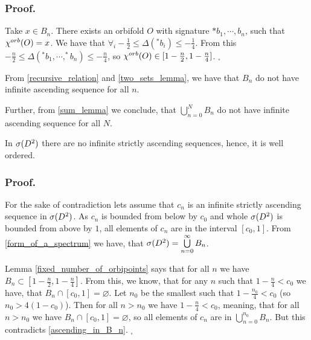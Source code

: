 \subsubsection{Proof.}
Take $x \in B_n$. There exists an orbifold $O$ with signature $\ast b_1, \cdots, b_n$, 
such that ${\chi^{orb}(O)} = x$. We have that $\forall_i -\frac{1}{2} \leq \Delta(^*b_i) \leq 
-\frac{1}{4}$. From this $-\frac{n}{2} \leq \Delta(^*b_1, \cdots, ^*b_n) \leq -\frac{n}{4}$, 
so ${\chi^{orb}(O)} \in [1-\frac{n}{2}, 1-\frac{n}{4}]$. $_\square$

\begin{observation}\label{ascending_in_B_n}
From \ref{recursive_relation} and \ref{two_sets_lemma}, we have that $B_n$ do not have 
infinite ascending sequence for all $n$. 

Further, from \ref{sum_lemma} we conclude, 
that $\bigcup\limits_{n=0}^N B_n$ do not have infinite ascending sequence for all $N$.
\end{observation}

\begin{theorem}\label{well_order}
In ${{\sigma}(D^2)}$ there are no infinite strictly ascending sequences, hence, it is well ordered.
\end{theorem}
\subsubsection{Proof.}
For the sake of contradiction lets assume that $c_n$ is an infinite strictly ascending sequence in 
${{\sigma}(D^2)}$. As $c_n$ is bounded from below by $c_0$ and whole ${{\sigma}(D^2)}$ is bounded from above 
by $1$, all elements of $c_n$ are in the interval $[c_0, 1]$. 
From \ref{form_of_a_spectrum} we have, that ${{\sigma}(D^2)} = \bigcup\limits^\infty_{n=0}B_n$. 

Lemma 
\ref{fixed_number_of_orbipoints} says that for all $n$ we
have $B_n \subset [1-\frac{n}{2}, 1 - \frac{n}{4}]$. From this, we know, that for any 
$n$ such that $1 - \frac{n}{4} < c_0$ 
we have, that $B_n \cap [c_0,1] = \varnothing $. Let $n_0$ be the smallest such that 
$1 - \frac{n_0}{4} < c_0$ (so $n_0 > 4(1-c_0)$). 
Then for all $n > n_0$ we have $1 - \frac{n}{4} < c_0$, meaning, that 
for all $n > n_0$ we have
$B_n \cap [c_0,1] = \varnothing $, so all elements of $c_n$ are in 
$\bigcup\limits_{n=0}^{n_0} B_n$.
But this contradicts \ref{ascending_in_B_n}.  $_\square$









